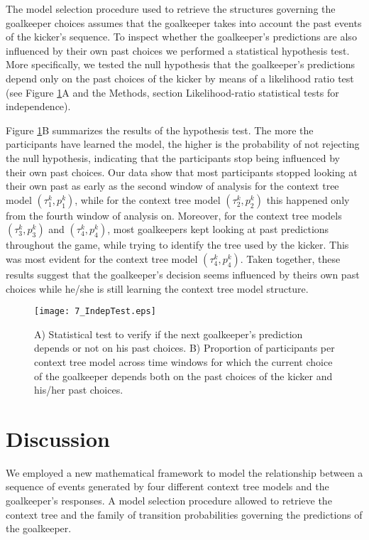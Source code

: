 \documentclass[fleqn,10pt]{wlscirep}
\begin{document}
The model selection procedure used to retrieve the structures governing the goalkeeper choices assumes that the goalkeeper takes into account the past events of the kicker's sequence. To inspect whether the goalkeeper's predictions are also influenced by their own past choices we performed a statistical hypothesis test. More specifically, we tested the null hypothesis that the goalkeeper's predictions depend only on the past choices of the kicker by means of a likelihood ratio test (see Figure \ref{fig:strategy}A and the Methods, section Likelihood-ratio statistical tests for independence). 

Figure \ref{fig:strategy}B summarizes the results of the hypothesis test. The more the participants have learned the model, the higher is the probability of not rejecting the null hypothesis, indicating that the participants stop being influenced by their own past choices. Our data show that most participants stopped looking at their own past as early as the second window of analysis for the context tree model $(\tau^k_1, p^k_1)$, while for the context tree model $(\tau^k_2, p^k_2)$ this happened only from the fourth window of analysis on. Moreover, for the context tree models $(\tau^k_3, p^k_3)$ and $(\tau^k_4, p^k_4)$, most goalkeepers kept looking at past predictions throughout the game, while trying to identify the tree used by the kicker. This was most evident for the context tree model $(\tau^k_4, p^k_4)$. Taken together, these results suggest that the goalkeeper’s decision seems influenced by theirs own past choices while he/she is still learning the context tree model structure.

\begin{figure}[h!]
	\centering
	\texttt{[image: 7\_IndepTest.eps]}%
	\caption{A) Statistical test to verify  if  the next goalkeeper’s prediction depends or not on his past choices. B) Proportion of participants per context tree model across time windows for which the current choice of the goalkeeper depends both on the past choices of the kicker and his/her past choices.}%
	\label{fig:strategy}%
\end{figure}
\FloatBarrier

\section*{Discussion}


We employed a new mathematical framework to model the relationship between a sequence of events generated by four different context tree models and the goalkeeper's responses. A model selection procedure allowed to retrieve the context tree and the family of transition probabilities governing the predictions of the goalkeeper. 
\end{document}
